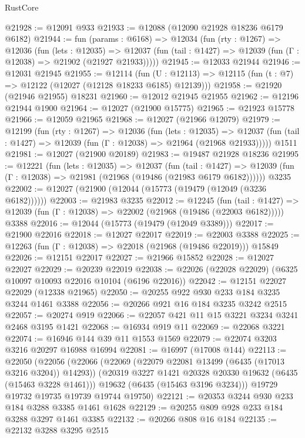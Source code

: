 \begin{lexlean}{RustCore}
\begin{coremodule}
@21928 := @12091 @933
@21933 := @12088 (@12090 @21928 @18236 @6179 @6182)
@21944 := fun (params : @6168) =>
  @12034
    (fun (rty : @1267) =>
    @12036
      (fun (lets : @12035) =>
      @12037 (fun (tail : @1427) => @12039 (fun (Γ : @12038) => @21902 (@21927 @21933)))))
@21945 := @12033 @21944
@21946 := @12031 @21945
@21955 := @12114
    (fun (U : @12113) => @12115 (fun (t : @7) => @12122 (@12027 (@12128 @18233 @6185) @12139)))
@21958 := @21920 (@21946 @21955) @18231
@21960 := @12012 @21945 @21955
@21962 := @12196 @21944 @1900
@21964 := @12027 (@21900 @15775)
@21965 := @21923 @15778
@21966 := @12059 @21965
@21968 := @12027 (@21966 @12079)
@21979 := @12199
    (fun (rty : @1267) =>
    @12036
      (fun (lets : @12035) =>
      @12037 (fun (tail : @1427) => @12039 (fun (Γ : @12038) => @21964 (@21968 @21933)))))
    @1511
@21981 := @12027 (@21900 @20189)
@21983 := @19487 @21928 @18236
@21995 := @12221
    (fun (lets : @12035) =>
    @12037
      (fun (tail : @1427) =>
      @12039 (fun (Γ : @12038) => @21981 (@21968 (@19486 (@21983 @6179 @6182))))))
    @3235
@22002 := @12027 (@21900 (@12044 (@15773 (@19479 (@12049 (@3236 @6182))))))
@22003 := @21983 @3235
@22012 := @12245
    (fun (tail : @1427) => @12039 (fun (Γ : @12038) => @22002 (@21968 (@19486 (@22003 @6182)))))
    @3388
@22016 := @12044 (@15773 (@19479 (@12049 @3389)))
@22017 := @21900 @22016
@22018 := @12027 @22017
@22019 := @22003 @3388
@22025 := @12263 (fun (Γ : @12038) => @22018 (@21968 (@19486 @22019))) @15849
@22026 := @12151 @22017
@22027 := @21966 @15852
@22028 := @12027 @22027
@22029 := @20239 @22019
@22038 := @22026 (@22028 @22029) (@6325 @10097 @10093 @22016 @10104 (@6196 @22016))
@22042 := @12151 @22027 @22029 (@12338 @21965)
@22050 := @20255 @922 @930 @233 @184 @3235 @3244 @1461 @3388
@22056 := @20266 @921 @16 @184 @3235 @3242 @2515
@22057 := @20274 @919
@22066 := @22057 @421 @11 @15 @3221 @3234 @3241 @2468 @3195 @1421
@22068 := @16934 @919 @11
@22069 := @22068 @3221
@22074 := @16946 @144 @39 @11 @1553 @1569
@22079 := @22074 @3203 @3216 @20297 @16988 @16994
@22081 := @16997 (@17008 @144)
@22113 := @22050
    (@22056
      (@22066
        (@22069 (@22079 @22081 @13499 (@6435 (@17013 @3216 @3204)) @14293))
        (@20319 @3227 @1421 @20328 @20330 @19632 (@6435 (@15463 @3228 @1461)))
        @19632
        (@6435 (@15463 @3196 @3234)))
      @19729
      @19732
      @19735
      @19739
      @19744
      @19750)
@22121 := @20353 @3244 @930 @233 @184 @3288 @3385 @1461 @1628
@22129 := @20255 @809 @928 @233 @184 @3288 @3297 @1461 @3385
@22132 := @20266 @808 @16 @184
@22135 := @22132 @3288 @3295 @2515

\end{coremodule}
\end{lexlean}
